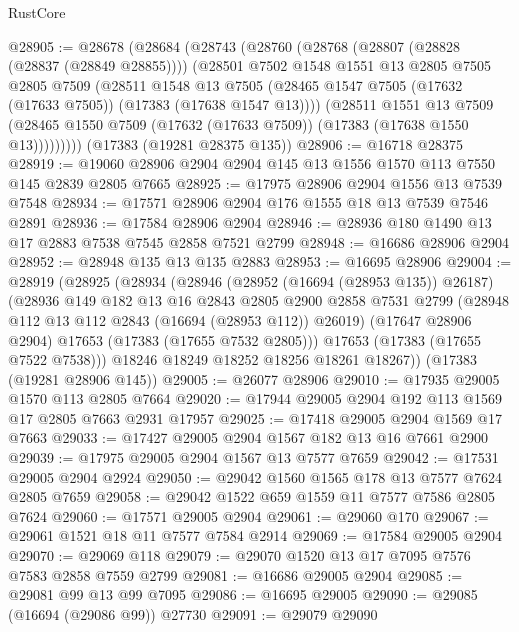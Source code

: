 \begin{lexlean}{RustCore}
\begin{coremodule}
@28905 := @28678
    (@28684
      (@28743
        (@28760
          (@28768
            (@28807 (@28828 (@28837 (@28849 @28855))))
            (@28501
              @7502
              @1548
              @1551
              @13
              @2805
              @7505
              @2805
              @7509
              (@28511
                @1548
                @13
                @7505
                (@28465 @1547 @7505 (@17632 (@17633 @7505)) (@17383 (@17638 @1547 @13))))
              (@28511
                @1551
                @13
                @7509
                (@28465 @1550 @7509 (@17632 (@17633 @7509)) (@17383 (@17638 @1550 @13)))))))))
    (@17383 (@19281 @28375 @135))
@28906 := @16718 @28375
@28919 := @19060 @28906 @2904 @2904 @145 @13 @1556 @1570 @113 @7550 @145 @2839 @2805 @7665
@28925 := @17975 @28906 @2904 @1556 @13 @7539 @7548
@28934 := @17571 @28906 @2904 @176 @1555 @18 @13 @7539 @7546 @2891
@28936 := @17584 @28906 @2904
@28946 := @28936 @180 @1490 @13 @17 @2883 @7538 @7545 @2858 @7521 @2799
@28948 := @16686 @28906 @2904
@28952 := @28948 @135 @13 @135 @2883
@28953 := @16695 @28906
@29004 := @28919
    (@28925
      (@28934
        (@28946
          (@28952 (@16694 (@28953 @135)) @26187)
          (@28936
            @149
            @182
            @13
            @16
            @2843
            @2805
            @2900
            @2858
            @7531
            @2799
            (@28948 @112 @13 @112 @2843 (@16694 (@28953 @112)) @26019)
            (@17647 @28906 @2904)
            @17653
            (@17383 (@17655 @7532 @2805)))
          @17653
          (@17383 (@17655 @7522 @7538)))
        @18246
        @18249
        @18252
        @18256
        @18261
        @18267))
    (@17383 (@19281 @28906 @145))
@29005 := @26077 @28906
@29010 := @17935 @29005 @1570 @113 @2805 @7664
@29020 := @17944 @29005 @2904 @192 @113 @1569 @17 @2805 @7663 @2931 @17957
@29025 := @17418 @29005 @2904 @1569 @17 @7663
@29033 := @17427 @29005 @2904 @1567 @182 @13 @16 @7661 @2900
@29039 := @17975 @29005 @2904 @1567 @13 @7577 @7659
@29042 := @17531 @29005 @2904 @2924
@29050 := @29042 @1560 @1565 @178 @13 @7577 @7624 @2805 @7659
@29058 := @29042 @1522 @659 @1559 @11 @7577 @7586 @2805 @7624
@29060 := @17571 @29005 @2904
@29061 := @29060 @170
@29067 := @29061 @1521 @18 @11 @7577 @7584 @2914
@29069 := @17584 @29005 @2904
@29070 := @29069 @118
@29079 := @29070 @1520 @13 @17 @7095 @7576 @7583 @2858 @7559 @2799
@29081 := @16686 @29005 @2904
@29085 := @29081 @99 @13 @99 @7095
@29086 := @16695 @29005
@29090 := @29085 (@16694 (@29086 @99)) @27730
@29091 := @29079 @29090

\end{coremodule}
\end{lexlean}
